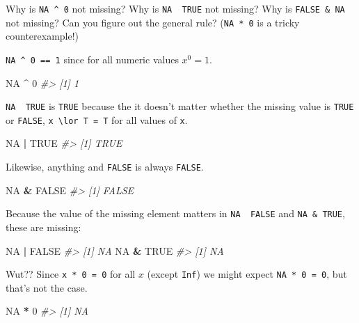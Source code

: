 \documentclass[]{book}
\newenvironment{Shaded}{\begin{snugshade}}{\end{snugshade}}
\newcommand{\CommentTok}[1]{\textcolor[rgb]{0.56,0.35,0.01}{\textit{#1}}}
\newcommand{\DecValTok}[1]{\textcolor[rgb]{0.00,0.00,0.81}{#1}}
\newcommand{\OperatorTok}[1]{\textcolor[rgb]{0.81,0.36,0.00}{\textbf{#1}}}
\newcommand{\OtherTok}[1]{\textcolor[rgb]{0.56,0.35,0.01}{#1}}
\newcommand{\StringTok}[1]{\textcolor[rgb]{0.31,0.60,0.02}{#1}}
\theoremstyle{definition}
\theoremstyle{definition}
\theoremstyle{definition}
\theoremstyle{remark}
\begin{document}
Why is \texttt{NA\ \^{}\ 0} not missing? Why is
\texttt{NA\ \textbar{}\ TRUE} not missing? Why is \texttt{FALSE\ \&\ NA}
not missing? Can you figure out the general rule? (\texttt{NA\ *\ 0} is
a tricky counterexample!)

\texttt{NA\ \^{}\ 0\ ==\ 1} since for all numeric values \(x ^ 0 = 1\).

\begin{Shaded}
\begin{Highlighting}[]
\OtherTok{NA} \OperatorTok{^}\StringTok{ }\DecValTok{0}
\CommentTok{#> [1] 1}
\end{Highlighting}
\end{Shaded}

\texttt{NA\ \textbar{}\ TRUE} is \texttt{TRUE} because the it doesn't
matter whether the missing value is \texttt{TRUE} or \texttt{FALSE},
\texttt{x\ \textbackslash{}lor\ T\ =\ T} for all values of \texttt{x}.

\begin{Shaded}
\begin{Highlighting}[]
\OtherTok{NA} \OperatorTok{|}\StringTok{ }\OtherTok{TRUE}
\CommentTok{#> [1] TRUE}
\end{Highlighting}
\end{Shaded}

Likewise, anything and \texttt{FALSE} is always \texttt{FALSE}.

\begin{Shaded}
\begin{Highlighting}[]
\OtherTok{NA} \OperatorTok{&}\StringTok{ }\OtherTok{FALSE}
\CommentTok{#> [1] FALSE}
\end{Highlighting}
\end{Shaded}

Because the value of the missing element matters in
\texttt{NA\ \textbar{}\ FALSE} and \texttt{NA\ \&\ TRUE}, these are
missing:

\begin{Shaded}
\begin{Highlighting}[]
\OtherTok{NA} \OperatorTok{|}\StringTok{ }\OtherTok{FALSE}
\CommentTok{#> [1] NA}
\OtherTok{NA} \OperatorTok{&}\StringTok{ }\OtherTok{TRUE}
\CommentTok{#> [1] NA}
\end{Highlighting}
\end{Shaded}

Wut?? Since \texttt{x\ *\ 0\ =\ 0} for all \(x\) (except \texttt{Inf})
we might expect \texttt{NA\ *\ 0\ =\ 0}, but that's not the case.

\begin{Shaded}
\begin{Highlighting}[]
\OtherTok{NA} \OperatorTok{*}\StringTok{ }\DecValTok{0}
\CommentTok{#> [1] NA}
\end{Highlighting}
\end{Shaded}
\end{document}
